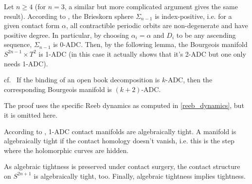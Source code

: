 Let $n \geq 4$ (for $n = 3$, a similar but more complicated argument gives the same result).
According to \cite{vK08}, the Brieskorn sphere $\Sigma_{n-1}$ is index-positive, i.e. for a given contact form $\alpha$, all contractible periodic orbits
are non-degenerate and have positive degree.
In particular, by choosing $\alpha_i = \alpha$ and $D_i$ to be any ascending sequence, $\Sigma_{n-1}$ is 0-ADC.
Then, by the following lemma, the Bourgeois manifold $S^{2n-1} \times T^2$ is 1-ADC (in this case it actually shows that it's 2-ADC but one only needs 1-ADC).

\begin{lemma} cf.~\cite[Lemma 2.8]{BGMZ22}\label{binding_adc}
    If the binding of an open book decomposition is $k$-ADC, then the corresponding Bourgeois manifold is $(k+2)$-ADC.
\end{lemma}
The proof uses the specific Reeb dynamics as computed in \cref{reeb_dynamics}, but it is omitted here.

According to \cite[Proposition 3.2 5 (c)]{BGMZ22}, 1-ADC contact manifolds are algebraically tight.
A manifold is algebraically tight if the contact homology doesn't vanish, i.e. this is the step where the holomorphic curves are hidden.

As algebraic tightness is preserved under contact surgery, the contact structure on $S^{2n+1}$ is algebraically tight, too.
Finally, algebraic tightness implies tightness.